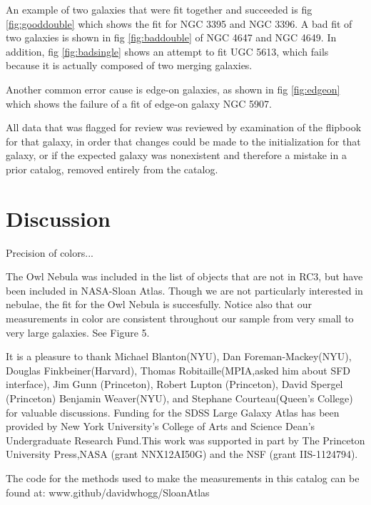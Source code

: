 \documentclass[12pt,preprint,pdftex]{aastex}
\begin{document}
An example of two galaxies that were fit together and succeeded is fig
\ref{fig:gooddouble} which shows the fit for NGC 3395 and NGC 3396. A
bad fit of two galaxies is shown in fig \ref{fig:baddouble} of NGC
4647 and NGC 4649. In addition, fig \ref{fig:badsingle} shows an
attempt to fit UGC 5613, which fails because it is actually composed
of two merging galaxies.

Another common error cause is edge-on galaxies, as shown in fig
\ref{fig:edgeon} which shows the failure of a fit of edge-on galaxy
NGC 5907.

All data that was flagged for review was reviewed by examination of
the flipbook for that galaxy, in order that changes could be made to
the initialization for that galaxy, or if the expected galaxy was
nonexistent and therefore a mistake in a prior catalog, removed
entirely from the catalog.

\section{Discussion}\label{sec:discussion}
Precision of colors...

The Owl Nebula was included in the list of objects that are not in
RC3, but have been included in NASA-Sloan Atlas. Though we are not
particularly interested in nebulae, the fit for the Owl Nebula is
succesfully. Notice also that our measurements in color are consistent
throughout our sample from very small to very large galaxies. See
Figure 5.


\acknowledgements It is a pleasure to thank Michael Blanton(NYU), Dan
Foreman-Mackey(NYU), Douglas Finkbeiner(Harvard), Thomas
Robitaille(MPIA,asked him about SFD interface), Jim Gunn (Princeton),
Robert Lupton (Princeton), David Spergel (Princeton) Benjamin
Weaver(NYU), and Stephane Courteau(Queen's College) for valuable
discussions. Funding for the SDSS Large Galaxy Atlas has been provided
by New York University's College of Arts and Science Dean's
Undergraduate Research Fund.This work was supported in part by The
Princeton University Press,NASA (grant NNX12AI50G) and the NSF (grant
IIS-1124794).


The code for the methods used to make the measurements in this catalog
can be found at: www.github/davidwhogg/SloanAtlas
\end{document}
